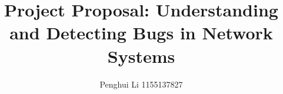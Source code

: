\title[]{Project Proposal: Understanding and Detecting Bugs in Network Systems}

\author{Penghui Li 1155137827}
